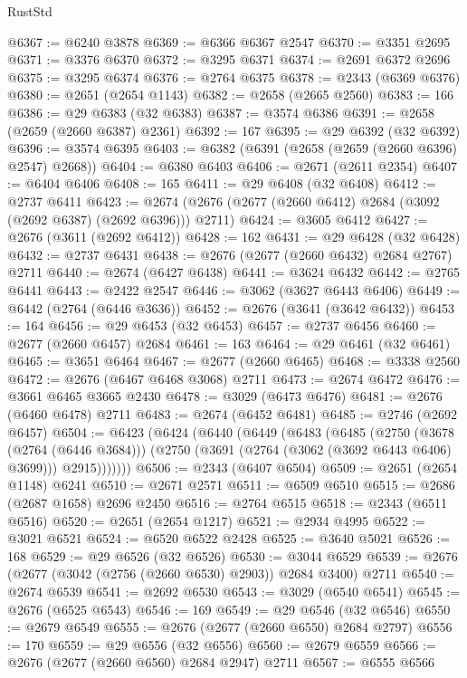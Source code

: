 \begin{lexlean}{RustStd}
\begin{coremodule}
@6367 := @6240 @3878
@6369 := @6366 @6367 @2547
@6370 := @3351 @2695
@6371 := @3376 @6370
@6372 := @3295 @6371
@6374 := @2691 @6372 @2696
@6375 := @3295 @6374
@6376 := @2764 @6375
@6378 := @2343 (@6369 @6376)
@6380 := @2651 (@2654 @1143)
@6382 := @2658 (@2665 @2560)
@6383 := 166
@6386 := @29 @6383 (@32 @6383)
@6387 := @3574 @6386
@6391 := @2658 (@2659 (@2660 @6387) @2361)
@6392 := 167
@6395 := @29 @6392 (@32 @6392)
@6396 := @3574 @6395
@6403 := @6382 (@6391 (@2658 (@2659 (@2660 @6396) @2547) @2668))
@6404 := @6380 @6403
@6406 := @2671 (@2611 @2354)
@6407 := @6404 @6406
@6408 := 165
@6411 := @29 @6408 (@32 @6408)
@6412 := @2737 @6411
@6423 := @2674 (@2676 (@2677 (@2660 @6412) @2684 (@3092 (@2692 @6387) (@2692 @6396))) @2711)
@6424 := @3605 @6412
@6427 := @2676 (@3611 (@2692 @6412))
@6428 := 162
@6431 := @29 @6428 (@32 @6428)
@6432 := @2737 @6431
@6438 := @2676 (@2677 (@2660 @6432) @2684 @2767) @2711
@6440 := @2674 (@6427 @6438)
@6441 := @3624 @6432
@6442 := @2765 @6441
@6443 := @2422 @2547
@6446 := @3062 (@3627 @6443 @6406)
@6449 := @6442 (@2764 (@6446 @3636))
@6452 := @2676 (@3641 (@3642 @6432))
@6453 := 164
@6456 := @29 @6453 (@32 @6453)
@6457 := @2737 @6456
@6460 := @2677 (@2660 @6457) @2684
@6461 := 163
@6464 := @29 @6461 (@32 @6461)
@6465 := @3651 @6464
@6467 := @2677 (@2660 @6465)
@6468 := @3338 @2560
@6472 := @2676 (@6467 @6468 @3068) @2711
@6473 := @2674 @6472
@6476 := @3661 @6465 @3665 @2430
@6478 := @3029 (@6473 @6476)
@6481 := @2676 (@6460 @6478) @2711
@6483 := @2674 (@6452 @6481)
@6485 := @2746 (@2692 @6457)
@6504 := @6423
    (@6424
      (@6440
        (@6449
          (@6483
            (@6485
              (@2750
                (@3678 (@2764 (@6446 @3684)))
                (@2750 (@3691 (@2764 (@3062 (@3692 @6443 @6406) @3699))) @2915)))))))
@6506 := @2343 (@6407 @6504)
@6509 := @2651 (@2654 @1148) @6241
@6510 := @2671 @2571
@6511 := @6509 @6510
@6515 := @2686 (@2687 @1658) @2696 @2450
@6516 := @2764 @6515
@6518 := @2343 (@6511 @6516)
@6520 := @2651 (@2654 @1217)
@6521 := @2934 @4995
@6522 := @3021 @6521
@6524 := @6520 @6522 @2428
@6525 := @3640 @5021
@6526 := 168
@6529 := @29 @6526 (@32 @6526)
@6530 := @3044 @6529
@6539 := @2676 (@2677 (@3042 (@2756 (@2660 @6530) @2903)) @2684 @3400) @2711
@6540 := @2674 @6539
@6541 := @2692 @6530
@6543 := @3029 (@6540 @6541)
@6545 := @2676 (@6525 @6543)
@6546 := 169
@6549 := @29 @6546 (@32 @6546)
@6550 := @2679 @6549
@6555 := @2676 (@2677 (@2660 @6550) @2684 @2797)
@6556 := 170
@6559 := @29 @6556 (@32 @6556)
@6560 := @2679 @6559
@6566 := @2676 (@2677 (@2660 @6560) @2684 @2947) @2711
@6567 := @6555 @6566

\end{coremodule}
\end{lexlean}
